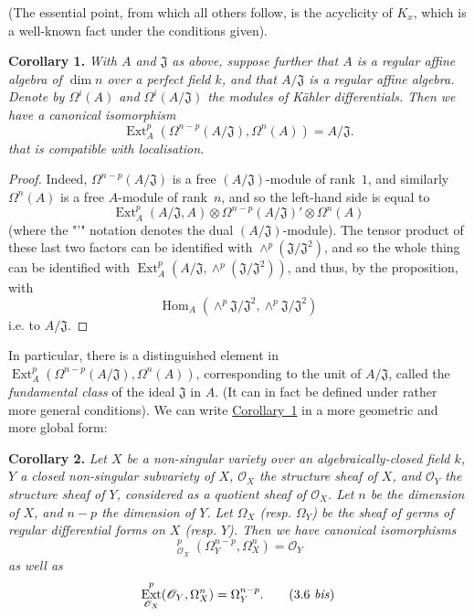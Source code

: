 \documentclass{article}
\newenvironment{itenv}[1]
  {\phantomsection\par\medskip\noindent\textbf{#1.}\itshape}
  {\medskip}
\newcommand{\scr}[1]{{\mathscr{#1}}}
\DeclareMathOperator{\Ext}{Ext}
\DeclareMathOperator{\Hom}{Hom}
\DeclareMathOperator{\shExt}{\underline{Ext}}
\newcommand{\oldpage}[1]{\marginpar{\footnotesize$\Big\vert$ \textit{p.~#1}}}
\begin{document}
(The essential point, from which all others follow, is the acyclicity of $K_x$, which is a well-known fact under the conditions given).

\begin{itenv}{Corollary 1}
\label{proposition4corollary1}
  With $A$ and $\mathfrak{J}$ as above, suppose further that $A$ is a regular affine algebra of $\dim n$ over a perfect field $k$, and that $A/\mathfrak{J}$ is a regular affine algebra.
  Denote by $\Omega^i(A)$ and $\Omega^i(A/\mathfrak{J})$ the modules of K\"{a}hler differentials.
  Then we have a canonical isomorphism
  \[
  \label{3.5}
    \Ext_A^p(\Omega^{n-p}(A/\mathfrak{J}),\Omega^n(A)) = A/\mathfrak{J}.
  \tag{3.5}
  \]
  that is compatible with localisation.
\end{itenv}

\begin{proof}
  Indeed, $\Omega^{n-p}(A/\mathfrak{J})$ is a free $(A/\mathfrak{J})$-module of rank~$1$, and similarly $\Omega^n(A)$ is a free $A$-module of rank~$n$, and so the left-hand side is equal to
  \[
    \Ext_A^p(A/\mathfrak{J},A) \otimes \Omega^{n-p}(A/\mathfrak{J})' \otimes \Omega^n(A)
  \]
  (where the "'" notation denotes the dual $(A/\mathfrak{J})$-module).
  The tensor product of these last two factors can be identified with $\wedge^p(\mathfrak{J}/\mathfrak{J}^2)$, and so the whole thing can be identified with $\Ext_A^p(A/\mathfrak{J},\wedge^p(\mathfrak{J}/\mathfrak{J}^2))$, and thus, by the proposition, with
  \[
    \Hom_A(\wedge^p \mathfrak{J}/\mathfrak{J}^2,\wedge^p \mathfrak{J}/\mathfrak{J}^2)
  \]
  i.e. to $A/\mathfrak{J}$.
\end{proof}

In particular, there is a distinguished element in $\Ext_A^p(\Omega^{n-p}(A/\mathfrak{J}),\Omega^n(A))$, corresponding to the unit of $A/\mathfrak{J}$, called the \emph{fundamental class} of the ideal $\mathfrak{J}$ in $A$.
(It can in fact be defined under rather more general conditions).
We can write \hyperref[proposition4corollary1]{Corollary~1} in a more geometric and more global form:

\begin{itenv}{Corollary 2}
\label{proposition4corollary2}
  Let $X$ be a non-singular variety over an algebraically-closed field $k$, $Y$ a closed non-singular subvariety of $X$, $\scr{O}_X$ the structure sheaf of $X$, and $\scr{O}_Y$ the structure sheaf of $Y$, considered as a quotient sheaf of $\scr{O}_X$.
  Let $n$ be the dimension of $X$, and $n-p$ the dimension of $Y$.
\oldpage{149-08}
  Let $\Omega_X$ (resp. $\Omega_Y$) be the sheaf of germs of regular differential forms on $X$ (resp. $Y$).
  Then we have canonical isomorphisms
  \[
  \label{3.6}
    \shExt_{\scr{O}_X}^p(\Omega_Y^{n-p},\Omega_X^n) = \scr{O}_Y
  \tag{3.6}
  \]
  as well as
  \[
  \label{3.6bis}
    \Ext_{\scr{O}_X}^p(\scr{O}_Y,\Omega_X^n) = \Omega_Y^{n-p}.
  \tag{3.6 \emph{bis}}
  \]
\end{itenv}
\end{document}
